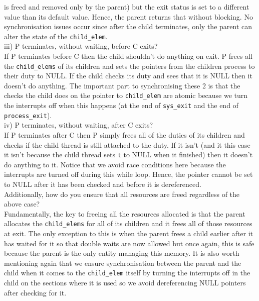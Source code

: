 \documentclass[11pt, a4paper]{article}
\begin{document}
is freed and removed only by the parent) but the exit status is set
to a different value than its default value. Hence, the parent returns
that without blocking. No synchronisation issues occur since after
the child terminates, only the parent can alter the state of the
\verb|child_elem|.\bigskip\\
iii) P terminates, without waiting, before C exits?\\
If P terminates before C then the child shouldn't do anything on exit.
P frees all the \verb|child_elems| of its children and sets the
pointers from the children process to their duty to NULL. If the child checks
its duty and sees that it is NULL then it doesn't do anything. The important
part to synchronising these 2 is that the checks the child does on the pointer
to \verb|child_elem| are atomic because we turn the interrupts off when this happens
(at the end of \verb|sys_exit| and the end of \verb|process_exit|).\bigskip\\
iv)  P terminates, without waiting, after C exits?\\
If P terminates after C then P simply frees
all of the duties of its children and checks if the child thread is still attached to
the duty. If it isn't (and it this case it isn't because the child thread sets
\verb|t| to NULL when it finished) then it doesn't do anything to it. Notice that
we avoid race conditions here because the interrupts are turned off during this while
loop. Hence, the pointer cannot be set to NULL after it has been checked and before
it is dereferenced.\bigskip\\
Additionally, how do you ensure that all resources are freed regardless of the above
case?\bigskip\\
Fundamentally, the key to freeing all the resources allocated is that the parent allocates
the \verb|child_elems| for all of its children and it frees all of those resources at exit.
The only exception to this is when the parent frees a child earlier after it has waited for it
so that double waits are now allowed but once again, this is safe because the parent is the only
entity managing this memory. It is also worth mentioning again that we ensure synchronisation between
the parent and the child when it comes to the \verb|child_elem| itself by turning the interrupts
off in the child on the sections where it is used so we avoid dereferencing NULL pointers
after checking for it.
\end{document}
